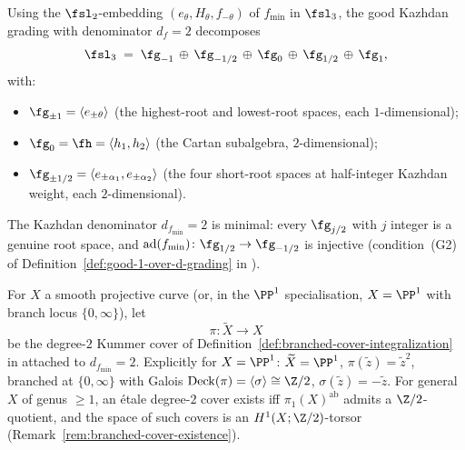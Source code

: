 \begin{definition}
\label{def:kazhdan-grading-bp}
Using the $\fsl_2$-embedding
$(e_{\theta}, H_{\theta}, f_{-\theta})$ of $f_{\min}$ in $\fsl_3$,
the good Kazhdan grading with denominator $d_f = 2$ decomposes
\[
 \fsl_3 \;=\; \fg_{-1} \,\oplus\, \fg_{-1/2} \,\oplus\, \fg_0
 \,\oplus\, \fg_{1/2} \,\oplus\, \fg_{1},
\]
with:
\begin{itemize}[nosep]
\item $\fg_{\pm 1} = \langle e_{\pm \theta}\rangle$ (the highest-root
 and lowest-root spaces, each $1$-dimensional);
\item $\fg_{0} = \fh = \langle h_1, h_2\rangle$ (the Cartan
 subalgebra, $2$-dimensional);
\item $\fg_{\pm 1/2} = \langle e_{\pm \alpha_1}, e_{\pm \alpha_2}\rangle$
 (the four short-root spaces at half-integer Kazhdan weight, each
 $2$-dimensional).
\end{itemize}
The Kazhdan denominator $d_{f_{\min}} = 2$ is minimal: every
$\fg_{j/2}$ with $j$ integer is a genuine root space, and
$\operatorname{ad}(f_{\min}) \colon \fg_{1/2} \to \fg_{-1/2}$ is
injective (condition~(G2) of
Definition~\ref{def:good-1-over-d-grading} in
\cite[\S\ref*{subsec:good-grading-denominator}]{Vol2-fractional-ghost-platonic}).
\end{definition}

\begin{definition}
\label{def:bp-degree-2-cover}
For $X$ a smooth projective curve (or, in the $\PP^1$
specialisation, $X = \PP^1$ with branch locus $\{0, \infty\}$), let
\[
 \pi \colon \widetilde X \to X
\]
be the degree-$2$ Kummer cover of
Definition~\ref{def:branched-cover-integralization} in
\cite[\S\ref*{subsec:branched-cover}]{Vol2-fractional-ghost-platonic} attached
to $d_{f_{\min}} = 2$. Explicitly for $X = \PP^1$:
$\widetilde X = \PP^1$, $\pi(\tilde z) = \tilde z^2$, branched at
$\{0, \infty\}$ with Galois
$\mathrm{Deck}(\pi) = \langle \sigma \rangle \cong \Z/2$,
$\sigma(\tilde z) = -\tilde z$. For general $X$ of genus $\ge 1$,
an \'etale degree-$2$ cover exists iff
$\pi_1(X)^{\mathrm{ab}}$ admits a $\Z/2$-quotient, and the space
of such covers is an $H^1(X; \Z/2)$-torsor
(Remark~\ref{rem:branched-cover-existence}).
\end{definition}

